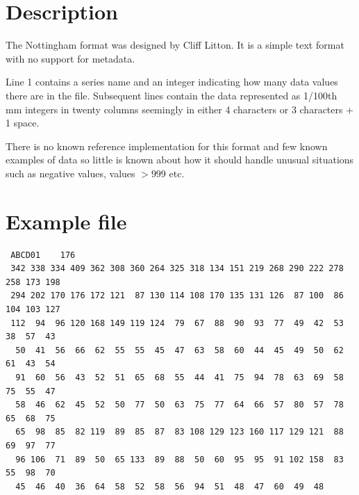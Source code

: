 \section{Description}

The Nottingham format was designed by Cliff Litton. It is a simple text format with no support for metadata.

Line 1 contains a series name and an integer indicating how many data values there are in the file. Subsequent lines contain the data represented as 1/100th mm integers in twenty columns seemingly in either 4 characters or 3 characters + 1 space.

There is no known reference implementation for this format and few known examples of data so little is known about how it should handle unusual situations such as negative values, values $>999$ etc. 

\newpage
\section{Example file}

\begin{lstlisting}
 ABCD01    176
 342 338 334 409 362 308 360 264 325 318 134 151 219 268 290 222 278 258 173 198
 294 202 170 176 172 121  87 130 114 108 170 135 131 126  87 100  86 104 103 127
 112  94  96 120 168 149 119 124  79  67  88  90  93  77  49  42  53  38  57  43
  50  41  56  66  62  55  55  45  47  63  58  60  44  45  49  50  62  61  43  54
  91  60  56  43  52  51  65  68  55  44  41  75  94  78  63  69  58  75  55  47
  58  46  62  45  52  50  77  50  63  75  77  64  66  57  80  57  78  65  68  75
  65  98  85  82 119  89  85  87  83 108 129 123 160 117 129 121  88  69  97  77
  96 106  71  89  50  65 133  89  88  50  60  95  95  91 102 158  83  55  98  70
  45  46  40  36  64  58  52  58  56  94  51  48  47  60  49  48
\end{lstlisting}

